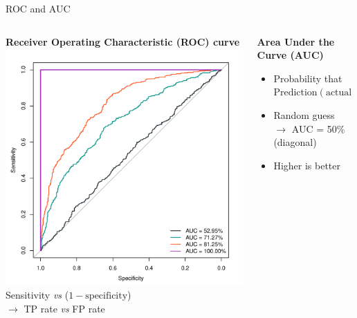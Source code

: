 \begin{frame}{ROC and AUC}
    \vspace{-1em}
    \begin{columns}[T]
        \begin{column}{0.5\textwidth}
            \begin{center}
                \textbf{Receiver Operating Characteristic (ROC) curve} \\
                \includegraphics[height=0.6\textheight]{figures/roc} \\
                Sensitivity \textit{vs} ($1 - \text{specificity}$) \\
                $\rightarrow$ TP rate \textit{vs} FP rate
            \end{center}
        \end{column}
        \pause
        \begin{column}{0.5\textwidth}
            \begin{center}
                \vspace{1ex}
                \textbf{Area Under the Curve (AUC)} \\[\medskipamount]
            \end{center}
            \begin{itemize}
                \item Probability that
                      $\text{Prediction}\!\left( \text{actual 1} \right) > \text{Prediction}\!\left( \text{actual 0} \right)$
                \item Random guess \\
                      $\rightarrow$ AUC = 50\% (diagonal)
                \item Higher is better
            \end{itemize}
        \end{column}
    \end{columns}
\end{frame}

